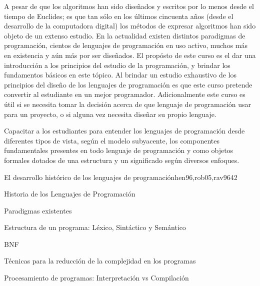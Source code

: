 \begin{syllabus}


\begin{justification}
A pesar de que los algoritmos han sido diseñados y escritos por lo menos
desde el tiempo de Euclides; es que tan sólo en los últimos cincuenta años
(desde el desarrollo de la computadora digital) los métodos de expresar
algoritmos han sido objeto de un extenso estudio. En la actualidad existen
distintos paradigmas de programación, cientos de lenguajes de programación
en uso activo, muchos más en existencia y aún más por ser diseñados.
El propósto de este curso es el dar una introducción a los principios del
estudio de la programación, y brindar los fundamentos básicos en este
tópico. Al brindar un estudio exhaustivo de los principios del diseño de los
lenguajes de programación es que este curso pretende convertir al estudiante
en un mejor programador. Adicionalmente este curso es útil si se necesita
tomar la decisión acerca de que lenguaje de programación usar para un
proyecto, o si alguna vez necesita diseñar su propio lenguaje.
\end{justification}

\begin{goals}
\item Capacitar a los estudiantes para entender los lenguajes de programación desde 
diferentes tipos de vista, según el modelo subyacente, los componentes fundamentales 
presentes en todo lenguaje de programación y como objetos formales dotados de una 
estructura y un significado según diversos enfoques.
\end{goals}

\begin{outcomes}
\end{outcomes}

\begin{unit}{El desarrollo histórico de los lenguajes de programación}{hen96,rob05,rav96}{4}{2}
\begin{topics}
      \item Historia de los Lenguajes de Programación
      \item Paradigmas existentes
      \item Estructura de un programa: Léxico, Sintáctico y Semántico
      \item BNF
      \item Técnicas para la reducción de la complejidad en los programas
      \item Procesamiento de programas: Interpretación vs Compilación
   \end{topics}


\end{unit}
\end{syllabus}

